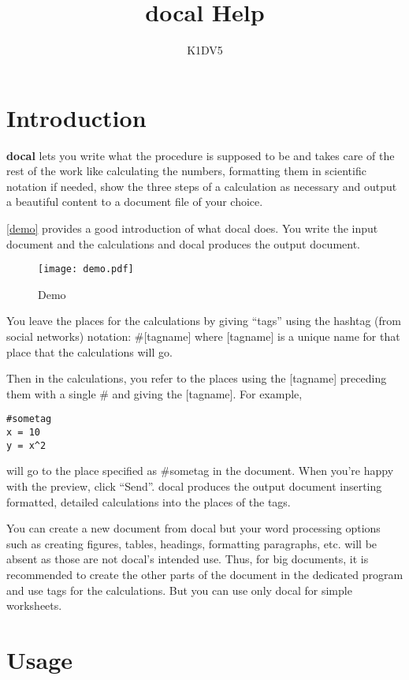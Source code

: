 \documentclass[12pt]{article}
\begin{document}
\title{docal Help}
\author{K1DV5}
\maketitle

\tableofcontents

\section{Introduction}
\textbf{docal} lets you write what the procedure is supposed to be and takes
care of the rest of the work like calculating the numbers, formatting them in
scientific notation if needed, show the three steps of a calculation as
necessary and output a beautiful content to a document file of your choice.

\autoref{demo} provides a good introduction of what docal does. You write the
input document and the calculations and docal produces the output document.

\begin{figure} [ht]
    \texttt{[image: demo.pdf]}
    \caption{Demo}
    \label{demo}
\end{figure}

You leave the places
for the calculations by giving ``tags'' using the hashtag (from social
networks) notation: \#[tagname] where [tagname] is a unique name for that place
that the calculations will go.

Then in the calculations, you refer to the places using the [tagname] preceding
them with a single \# and giving the [tagname]. For example,

\begin{verbatim}
#sometag
x = 10
y = x^2
\end{verbatim}

will go to the place specified as \#sometag in the document.  When you're happy
with the preview, click ``Send''. docal produces the output document inserting
formatted, detailed calculations into the places of the tags.

You can create a new document from docal but your word processing options such
as creating figures, tables, headings, formatting paragraphs, etc. will be
absent as those are not docal's intended use. Thus, for big documents, it is
recommended to create the other parts of the document in the dedicated program
and use tags for the calculations. But you can use only docal for simple
worksheets.

\section{Usage}
\end{document}
